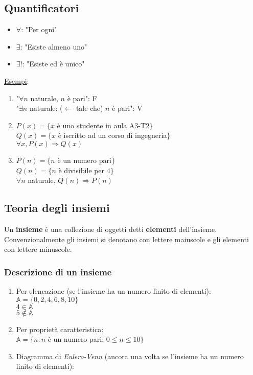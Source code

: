 \documentclass{article}
\begin{document}
\subsection*{Quantificatori}
\begin{itemize}
	\item $\forall$: "Per ogni"
	\item $\exists$: "Esiste almeno uno"
	\item $\exists!$: "Esiste ed è unico"
\end{itemize}

\underline{Esempi}:
\begin{enumerate}
	\item "$\forall n$ naturale, $n$ è pari": F\\
		  "$\exists n$ naturale: ($\leftarrow$ tale che) $n$ è pari": V
	\item $P(x)=\{x$ è uno studente in aula A3-T2$\}$\\
		  $Q(x)=\{x$ è iscritto ad un corso di ingegneria$\}$\\
		  $\forall x, P(x)\Rightarrow Q(x)$
	\item $P(n)=\{n$ è un numero pari$\}$\\
		  $Q(n)=\{n$ è divisibile per $4\}$\\
		  $\forall n$ naturale, $Q(n)\Rightarrow P(n)$
\end{enumerate}

\subsection*{Teoria degli insiemi}
Un \textbf{insieme} è una collezione di oggetti detti \textbf{elementi} dell'insieme.\\
Convenzionalmente gli insiemi si denotano con lettere maiuscole e gli elementi con lettere minuscole.
\subsubsection*{Descrizione di un insieme}
\begin{enumerate}
	\item Per elencazione (se l'insieme ha un numero finito di elementi):\\
		  $\mathbb{A}=\{0,2,4,6,8,10\}$\\
		  $4\in\mathbb{A}$\\
		  $5\notin\mathbb{A}$
	\item Per proprietà caratteristica:\\
		  $\mathbb{A}=\{n:n$ è un numero pari: $0\le n\le10\}$
	\item Diagramma di \textit{Eulero-Venn} (ancora una volta se l'insieme ha un numero finito di elementi):
\end{enumerate}
\end{document}
